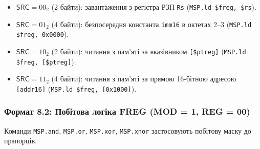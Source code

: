 \documentclass[11pt,a4paper]{article}
\newcommand{\reg}[1]{\texttt{#1}}
\newcommand{\field}[1]{\textsf{#1}}
\begin{document}
\begin{itemize}
  \item $\field{SRC} = 00_2$ (2 байти): завантаження з регістра РЗП \reg{Rs} (\texttt{MSP.ld \$freg, \$rs}).
  \item $\field{SRC} = 01_2$ (4 байти): безпосередня константа \texttt{imm16} в октетах 2--3 (\texttt{MSP.ld \$freg, 0x0000}).
  \item $\field{SRC} = 10_2$ (2 байти): читання з пам'яті за вказівником \texttt{[\$ptreg]} (\texttt{MSP.ld \$freg, [\$ptreg]}).
  \item $\field{SRC} = 11_2$ (4 байти): читання з пам'яті за прямою 16-бітною адресою \texttt{[addr16]} (\texttt{MSP.ld \$freg, [0x1000]}).
\end{itemize}

\subsubsection{Формат 8.2: Побітова логіка FREG (MOD = 1, REG = 00)}
Команди \texttt{MSP.and}, \texttt{MSP.or}, \texttt{MSP.xor}, \texttt{MSP.xnor} застосовують побітову маску до прапорців.
\end{document}
